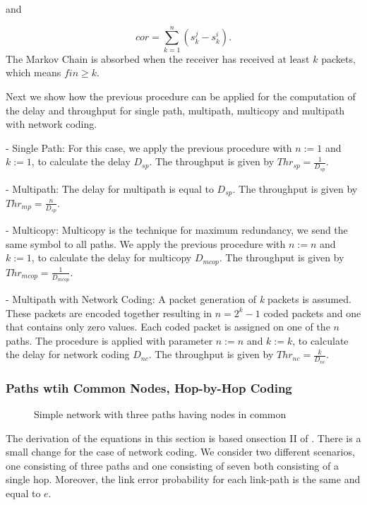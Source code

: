 \documentclass[journal, onecolumn, 12pt]{IEEEtran}
\begin{document}
and

\begin{equation}
cor=\sum_{k=1}^{n}{(s_{k}^{j}-s_{k}^{i})}.
\end{equation}
The Markov Chain is absorbed when the receiver has received at least $k$ packets, which means $fin \geq k$.

Next we show how the previous procedure can be applied for the computation of the delay and throughput for single path, multipath, multicopy and multipath with network coding.

- Single Path: For this case, we apply the previous procedure with $n:=1$ and $k:=1$, to calculate the delay $D_{sp}$.
The throughput is given by $Thr_{sp}=\frac{1}{D_{sp}}$.

- Multipath: The delay for multipath is equal to $D_{sp}$.
The throughput is given by $Thr_{mp}=\frac{n}{D_{sp}}$.

- Multicopy: Multicopy is the technique for maximum redundancy, we send the same symbol to all paths.
We apply the previous procedure with $n:=n$ and $k:=1$, to calculate the delay for multicopy $D_{mcop}$.
The throughput is given by $Thr_{mcop}=\frac{1}{D_{mcop}}$.

- Multipath with Network Coding:
A packet generation of \textit{k} packets is assumed.
These packets are encoded together resulting in $n=2^{k}-1$ coded packets and one that contains only zero values.
Each coded packet is assigned on one of the $n$ paths.
The procedure is applied with parameter $n:=n$ and $k:=k$, to calculate the delay for network coding $D_{nc}$.
The throughput is given by $Thr_{nc}=\frac{k}{D_{nc}}$.

\subsubsection{Paths wtih Common Nodes, Hop-by-Hop Coding}
\label{sec:analysis_hopbyhop}

\begin{figure}[ht]
\centering
{}
\label{fig:network}
\caption{Simple network with three paths having nodes in common}
\end{figure}

The derivation of the equations in this section is based onsection II of \cite{b:pathdivgain1}.
There is a small change for the case of network coding.
We consider two different scenarios, one consisting of three paths and one consisting of seven both consisting of a single hop.
Moreover, the link error probability for each link-path is the same and equal to $e$.
\end{document}
